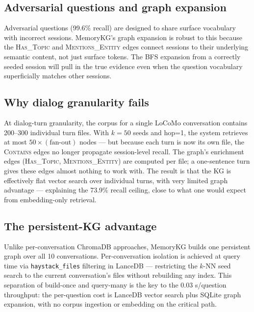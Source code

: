 \documentclass[11pt,a4paper]{article}
\begin{document}
\subsection{Adversarial questions and graph expansion}

Adversarial questions (99.6\% recall) are designed to share surface vocabulary
with incorrect sessions.
MemoryKG's graph expansion is robust to this because the \textsc{Has\_Topic}
and \textsc{Mentions\_Entity} edges connect sessions to their underlying
semantic content, not just surface tokens.
The BFS expansion from a correctly seeded session will pull in the true
evidence even when the question vocabulary superficially matches other sessions.

\subsection{Why dialog granularity fails}

At dialog-turn granularity, the corpus for a single LoCoMo conversation
contains 200--300 individual turn files.
With $k{=}50$ seeds and hop=1, the system retrieves at most $50 \times (\text{fan-out})$
nodes --- but because each turn is now its own file, the \textsc{Contains} edges
no longer propagate session-level recall.
The graph's enrichment edges (\textsc{Has\_Topic}, \textsc{Mentions\_Entity})
are computed per file; a one-sentence turn gives these edges almost nothing
to work with.
The result is that the KG is effectively flat vector search over individual
turns, with very limited graph advantage --- explaining the 73.9\% recall
ceiling, close to what one would expect from embedding-only retrieval.

\subsection{The persistent-KG advantage}

Unlike per-conversation ChromaDB approaches, MemoryKG builds one persistent
graph over all 10 conversations.
Per-conversation isolation is achieved at query time via
\texttt{haystack\_files} filtering in LanceDB --- restricting the $k$-NN seed
search to the current conversation's files without rebuilding any index.
This separation of build-once and query-many is the key to the 0.03 s/question
throughput: the per-question cost is LanceDB vector search plus SQLite graph
expansion, with no corpus ingestion or embedding on the critical path.

\end{document}
